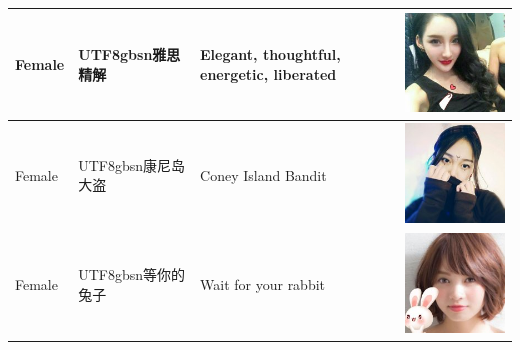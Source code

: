 \documentclass[11pt]{article}
\newcommand{\zh}[1]{\begin{CJK*}{UTF8}{gbsn}#1\end{CJK*}}
\begin{document}
\begin{table}[H]
\begin{tabular}{|p{}|p{}|p{}|p{}|}
	Female & \zh{雅思精解} & Elegant, thoughtful, energetic, liberated & \begin{minipage}{.2\textwidth}\includegraphics[width=.45\linewidth, height=.45\linewidth]{figures/ordinary_avatars/f4.jpg}\end{minipage} \\ \hline
	Female & \zh{康尼岛大盗} & Coney Island Bandit & \begin{minipage}{.2\textwidth}\includegraphics[width=.45\linewidth, height=.45\linewidth]{figures/ordinary_avatars/f5.jpg}\end{minipage} \\ \hline
	Female & \zh{等你的兔子} & Wait for your rabbit & \begin{minipage}{.2\textwidth}\includegraphics[width=.45\linewidth, height=.45\linewidth]{figures/ordinary_avatars/f6.jpg}\end{minipage} \\ \hline

\end{tabular}
\end{table}
\end{document}

